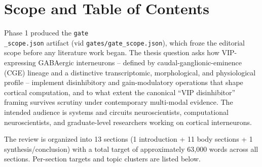 \documentclass[11pt]{article}
\begin{document}
\section{Scope and Table of Contents}\label{sec-methods-scope}

Phase 1 produced the \texttt{gate\\_scope.json} artifact (vid \texttt{gates/gate\_scope.json}), which froze the editorial scope before any literature work began. The thesis question asks how VIP-expressing GABAergic interneurons -- defined by caudal-ganglionic-eminence (CGE) lineage and a distinctive transcriptomic, morphological, and physiological profile -- implement disinhibitory and gain-modulatory operations that shape cortical computation, and to what extent the canonical ``VIP disinhibitor'' framing survives scrutiny under contemporary multi-modal evidence. The intended audience is systems and circuits neuroscientists, computational neuroscientists, and graduate-level researchers working on cortical interneurons.

The review is organized into 13 sections (1 introduction + 11 body sections + 1 synthesis/conclusion) with a total target of approximately 63,000 words across all sections. Per-section targets and topic clusters are listed below.
\end{document}
